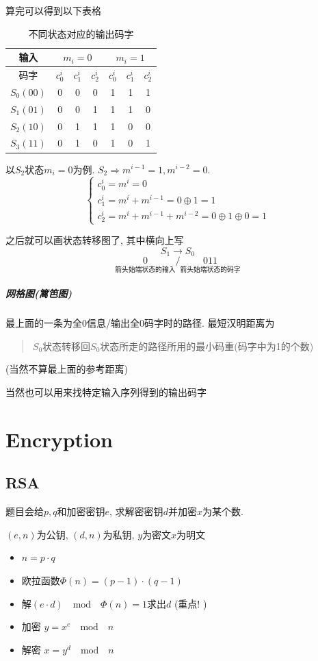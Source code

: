 \documentclass[a4paper]{report}
\begin{document}
算完可以得到以下表格

\begin{table}[H]
  \centering
    \begin{tabular}{|c|ccc|ccc|}
      \hline
    输入 & \multicolumn{3}{c|}{$m_i=0$} & \multicolumn{3}{c|}{$m_i=1$} \\
    \hline
    码字 & $c_0^i$    & $c_1^i$   & $c_2^i$   & $c_0^i$   &  $c_1^i$   &  $c_2^i$\\
    \hline
    $S_0(00)$    &   0    &  0     &  0     &   1    &   1    & 1 \\
    $S_1(01)$    &   0    &  0     &  1     &   1    &   1    & 0 \\
    $S_2(10)$    &   0    &  1     &  1     &   1    &   0    & 0 \\
    $S_3(11)$    &   0    &  1     &  0     &   1    &  0     & 1 \\
    \hline
    \end{tabular}%
  \caption{不同状态对应的输出码字}
\end{table}%

以$S_2$状态$m_i=0$为例. $S_2\Rightarrow m^{i-1}=1,m^{i-2}=0$. 
$$\begin{cases}
  c_0^i=m^i=0
  \\c_1^i=m^i+m^{i-1}=0\oplus 1=1
  \\c_2^i=m^i+m^{i-1}+m^{i-2}=0\oplus 1\oplus 0=1
\end{cases}$$

之后就可以画状态转移图了, 其中横向上写
$$S_1\rightarrow S_0$$
$$\underset{\text{箭头始端状态的输入}}{0} / \underset{\text{箭头始端状态的码字}}{011}$$



\paragraph{网格图(篱笆图)}
最上面的一条为全0信息/输出全0码字时的路径. 
最短汉明距离为
\begin{quotation}
  $S_0$状态转移回$S_0$状态所走的路径所用的最小码重(码字中为1的个数)
\end{quotation}
(当然不算最上面的参考距离)

当然也可以用来找特定输入序列得到的输出码字



\chapter{Encryption}
\section{RSA}
题目会给$p,q$和加密密钥$e$, 求解密密钥$d$并加密$x$为某个数. 

$(e,n)$为公钥, $(d,n)$为私钥, $y$为密文$x$为明文
\begin{itemize}
  \item $n=p\cdot q$
  \item 欧拉函数$\Phi(n)=(p-1)\cdot (q-1)$
  \item 解$(e\cdot d)\quad \text{mod} \quad \Phi(n)=1$求出$d$ (重点! )
  \item 加密 $y=x^e \quad \text{mod}\quad n$
  \item 解密 $x=y^d \quad\text{mod}\quad n$
\end{itemize}
\end{document}

